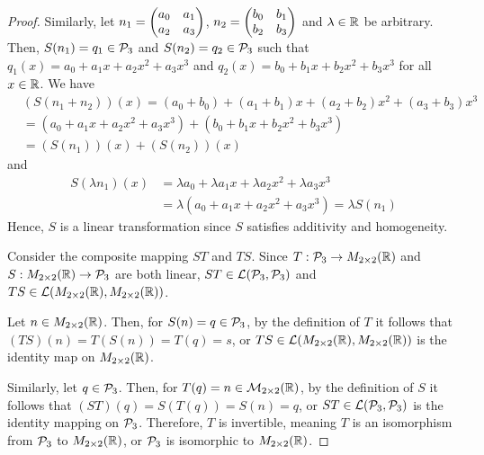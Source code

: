 \begin{proof}
    Similarly, let $n_1=\MatTwoTwo{a_0}{a_1}{a_2}{a_3}$, $n_2=\MatTwoTwo{b_0}{b_1}{b_2}{b_3}$ and $\lambda\in\R$ be arbitrary.
    Then, $S(n_1)=q_1\in\P_3$ and $S(n_2)=q_2\in\P_3$ such that $q_1(x)=a_0+a_1x+a_2x^2+a_3x^3$ and $q_2(x)=b_0+b_1x+b_2x^2+b_3x^3$ for all $x\in\R$.
    We have
    \[
        \begin{aligned}
            &(S(n_1+n_2))(x)=(a_0+b_0)+(a_1+b_1)x+(a_2+b_2)x^2+(a_3+b_3)x^3\\
            &=(a_0+a_1x+a_2x^2+a_3x^3)+(b_0+b_1x+b_2x^2+b_3x^3)\\
            &=(S(n_1))(x)+(S(n_2))(x)
        \end{aligned}
    \]
    and 
    \[
        \begin{aligned}
            S(\lambda n_1)(x)&=\lambda a_0+\lambda a_1x+\lambda a_2x^2+\lambda a_3x^3\\
            &=\lambda(a_0+a_1x+a_2x^2+a_3x^3)=\lambda S(n_1)
        \end{aligned}
    \]
    Hence, $S$ is a linear transformation since $S$ satisfies additivity and homogeneity.

    Consider the composite mapping $ST$ and $TS$. Since $T:\P_3\rightarrow M_{2\times 2}(\R)$ and $S:M_{2\times 2}(\R)\rightarrow\P_3$ are both linear,
    $ST\in\mathcal{L}(\P_3,\P_3)$ and $TS\in\mathcal{L}(M_{2\times 2}(\R), M_{2\times 2}(\R))$.

    Let $n\in M_{2\times 2}(\R)$. 
    Then, for $S(n)=q\in\P_3$, by the definition of $T$ it follows that $(TS)(n)=T(S(n))=T(q)=s$, or $TS\in\mathcal{L}(M_{2\times 2}(\R), M_{2\times 2}(\R))$ is the identity map on $M_{2\times 2}(\R)$.

    Similarly, let $q\in\P_3$.
    Then, for $T(q)=n\in\M_{2\times 2}(\R)$, by the definition of $S$ it follows that $(ST)(q)=S(T(q))=S(n)=q$, or $ST\in\mathcal{L}(\P_3,\P_3)$ is the identity mapping on $\P_3$.
    Therefore, $T$ is invertible, meaning $T$ is an isomorphism from $\P_3$ to $M_{2\times 2}(\R)$, or $\P_3$ is isomorphic to $M_{2\times 2}(\R)$.
\end{proof}